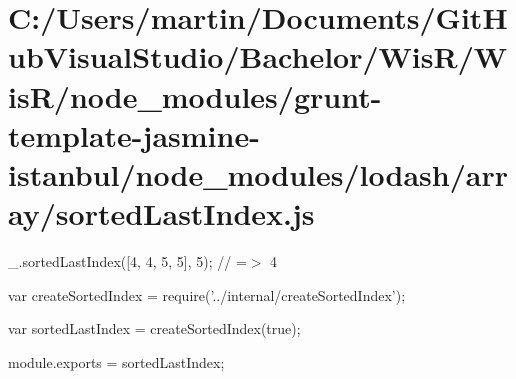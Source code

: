 \hypertarget{_c_1_2_users_2martin_2_documents_2_git_hub_visual_studio_2_bachelor_2_wis_r_2_wis_r_2node_module64e8cf3721e3f1a5a3cf7cae4511b787}{}\section{C\+:/\+Users/martin/\+Documents/\+Git\+Hub\+Visual\+Studio/\+Bachelor/\+Wis\+R/\+Wis\+R/node\+\_\+modules/grunt-\/template-\/jasmine-\/istanbul/node\+\_\+modules/lodash/array/sorted\+Last\+Index.\+js}
\+\_\+.\+sorted\+Last\+Index(\mbox{[}4, 4, 5, 5\mbox{]}, 5); // =$>$ 4


\begin{DoxyCodeInclude}
var createSortedIndex = require(\textcolor{stringliteral}{'../internal/createSortedIndex'});

var sortedLastIndex = createSortedIndex(\textcolor{keyword}{true});

module.exports = sortedLastIndex;
\end{DoxyCodeInclude}
 